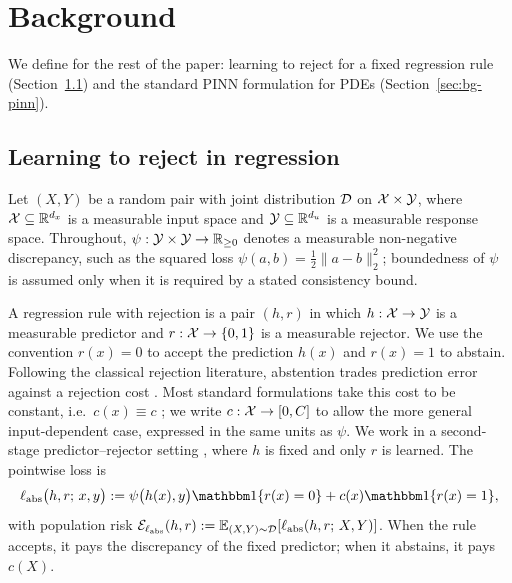 \section{Background}
\label{sec:prelim}

We define for the rest of the paper: learning to
reject for a fixed regression rule (Section~\ref{sec:bg-reject}) and the
standard PINN formulation for PDEs (Section~\ref{sec:bg-pinn}).

\subsection{Learning to reject in regression}
\label{sec:bg-reject}

Let $(X,Y)$ be a random pair with joint distribution $\mathcal{D}$ on
$\mathcal{X} \times \mathcal{Y}$, where $\mathcal{X} \subseteq \mathbb{R}^{d_x}$ is a measurable
input space and $\mathcal{Y} \subseteq \mathbb{R}^{d_u}$ is a measurable response space.
Throughout,
$\psi:\mathcal{Y}\times\mathcal{Y}\to\mathbb{R}_{\geq 0}$ denotes a measurable non-negative
discrepancy, such as the squared loss
$\psi(a,b)=\tfrac{1}{2}\|a-b\|_2^2$; boundedness of $\psi$ is assumed only
when it is required by a stated consistency bound.

A regression rule with rejection is a pair $(h,r)$ in which
$h:\mathcal{X}\to\mathcal{Y}$ is a measurable predictor and
$r:\mathcal{X}\to\{0,1\}$ is a measurable rejector. We use the convention
$r(x)=0$ to accept the prediction $h(x)$ and $r(x)=1$ to abstain. Following
the classical rejection literature, abstention trades prediction error
against a rejection cost \citep{chow1970,bartlett2008classification,
cortes,cortes2024theory}. Most standard formulations take this cost to be
constant, i.e.\ $c(x)\equiv c$ \citep{chow1970,
bartlett2008classification,Geifman_El-Yaniv_2017,ni2019calibration,
cao2022generalizing,Mao_Mohri_Zhong_2023}; we write
$c:\mathcal{X}\to[0,C]$ to allow the more general input-dependent case, expressed
in the same units as $\psi$. We work in a second-stage
predictor--rejector setting \citep{cortes,Mao_Mohri_Zhong_2023,
cheng2023regression}, where $h$ is fixed and only $r$ is learned. The
pointwise loss is
\begin{equation}
  \ell_{\mathrm{abs}}\bigl(h,r;\,x,y\bigr)
  :=
  \psi\bigl(h(x),y\bigr)\ind\{r(x)=0\}
  +
  c(x)\ind\{r(x)=1\},
  \label{eq:abs-loss}
\end{equation}
with population risk
$\mathcal{E}_{\ell_{\mathrm{abs}}}(h,r)
:=\mathbb{E}_{(X,Y)\sim\mathcal{D}}[\ell_{\mathrm{abs}}(h,r;\,X,Y)]$. When the rule
accepts, it pays the discrepancy of the fixed predictor; when it abstains,
it pays $c(X)$.

